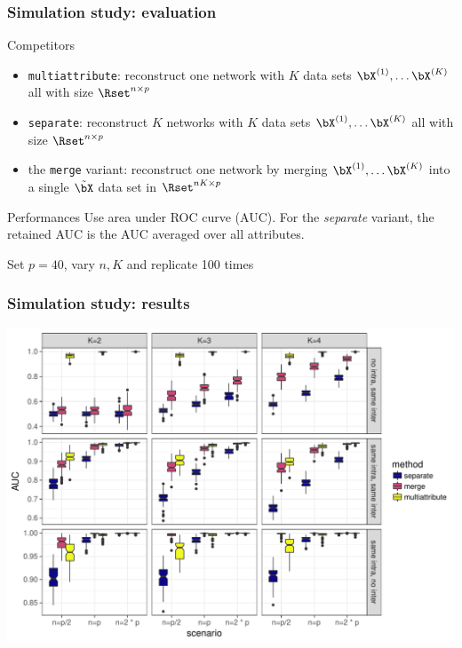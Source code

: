 \begin{frame}
  \frametitle{Simulation study: evaluation}

  \begin{block}{Competitors}  
  \begin{itemize}
  \item \texttt{multiattribute}: reconstruct one network with
   $K$ data sets $\bX^{(1)}, \dots \bX^{(K)}$ all with size
  $\Rset^{n\times p}$

  \item \texttt{separate}: reconstruct $K$ networks with
   $K$ data sets $\bX^{(1)}, \dots \bX^{(K)}$ all with size
  $\Rset^{n\times p}$

  \item the \texttt{merge} variant: reconstruct one network 
    by merging $\bX^{(1)}, \dots \bX^{(K)}$ into a single
    $\tilde\bX$ data set in $\Rset^{nK \times p}$
  \end{itemize}
  \end{block}
  
  \begin{block}{Performances}  
    Use area under ROC curve (AUC). For the \textit{separate} variant, the retained AUC is the AUC
    averaged over all attributes.  
  \end{block}

  \rsa Set $p=40$, vary $n, K$ and replicate 100 times

\end{frame}


\begin{frame}
  \frametitle{Simulation study: results}
  
  \includegraphics[width=\textwidth]{../../chapter/figures/res_simu_new}

\end{frame}

